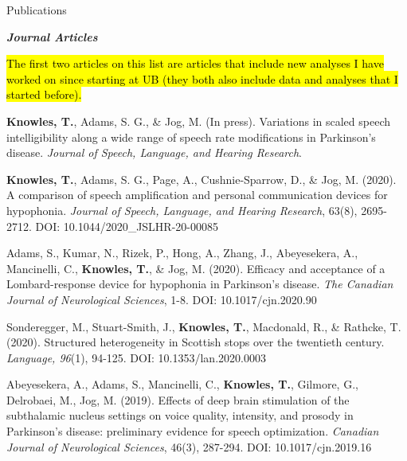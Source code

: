 \documentclass{resume} %
\begin{document}


\begin{rSection}{Publications}

\begin{center}
	{\bf \emph{Journal Articles}}
	
	\hl{The first two articles on this list are articles that include new analyses I have worked on since starting at UB (they both also include data and analyses that I started before).}
\end{center}

\begin{etaremune}

	\item {\bf Knowles, T.}, Adams, S. G., \& Jog, M. (In press). Variations in scaled speech intelligibility along a wide range of speech rate modifications in Parkinson’s disease. \emph{Journal of Speech, Language, and Hearing Research}.

	\item {\bf Knowles, T.}, Adams, S. G., Page, A., Cushnie-Sparrow, D., \& Jog, M. (2020). A comparison of speech amplification and personal communication devices for hypophonia. \emph{Journal of Speech, Language, and Hearing Research}, 63(8), 2695-2712. DOI: 10.1044/2020\_JSLHR-20-00085
	
	\item Adams, S., Kumar, N., Rizek, P., Hong, A., Zhang, J., Abeyesekera, A., Mancinelli, C., {\bf Knowles, T.}, \& Jog, M. (2020). Efficacy and acceptance of a Lombard-response device for hypophonia in Parkinson’s disease. \emph{The Canadian Journal of Neurological Sciences}, 1-8. DOI: 10.1017/cjn.2020.90

	\item Sonderegger, M., Stuart-Smith, J., {\bf Knowles, T.}, Macdonald, R., \& Rathcke, T. (2020). Structured heterogeneity in Scottish stops over the twentieth century. \emph{Language, 96}(1), 94-125. DOI: 10.1353/lan.2020.0003
	
	\item Abeyesekera, A., Adams, S., Mancinelli, C., {\bf Knowles, T.}, Gilmore, G., Delrobaei, M., Jog, M. (2019).  Effects of deep brain stimulation of the subthalamic nucleus settings on voice quality, intensity, and prosody in Parkinson’s disease: preliminary evidence for speech optimization. \emph{Canadian Journal of Neurological Sciences}, 46(3), 287-294. DOI: 10.1017/cjn.2019.16	


\end{etaremune}
\end{rSection}
\end{document}
